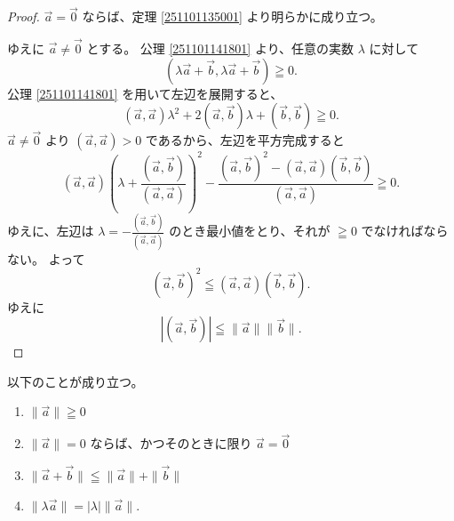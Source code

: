 \begin{proof}
  \(\vec{a}=\vec{0}\) ならば、定理 \ref{251101135001} より明らかに成り立つ。

  ゆえに \(\vec{a}\neq\vec{0}\) とする。
  公理 \ref{251101141801} より、任意の実数 \(\lambda\) に対して
  \[(\lambda\vec{a}+\vec{b},\lambda\vec{a}+\vec{b})\geqq0.\]
  公理 \ref{251101141801} を用いて左辺を展開すると、
  \[(\vec{a},\vec{a})\lambda^2+2(\vec{a},\vec{b})\lambda+(\vec{b},\vec{b})\geqq0.\]
  \(\vec{a}\neq\vec{0}\) より \((\vec{a},\vec{a})>0\) であるから、左辺を平方完成すると
  \[(\vec{a},\vec{a})\left(\lambda+\frac{(\vec{a},\vec{b})}{(\vec{a},\vec{a})}\right)^2-\frac{(\vec{a},\vec{b})^2-(\vec{a},\vec{a})(\vec{b},\vec{b})}{(\vec{a},\vec{a})}\geqq0.\]
  ゆえに、左辺は \(\displaystyle\lambda=-\frac{(\vec{a},\vec{b})}{(\vec{a},\vec{a})}\) のとき最小値をとり、それが \(\geqq0\) でなければならない。
  よって
  \[(\vec{a},\vec{b})^2\leqq(\vec{a},\vec{a})(\vec{b},\vec{b}).\]
  ゆえに
  \[|(\vec{a},\vec{b})|\leqq\|\vec{a}\|\|\vec{b}\|.\]
\end{proof}

\begin{thm}
  以下のことが成り立つ。
  \begin{enumerate}
    \item \(\|\vec{a}\|\geqq0\)
    \item \(\|\vec{a}\|=0\) ならば、かつそのときに限り \(\vec{a}=\vec{0}\)
    \item \(\|\vec{a}+\vec{b}\|\leqq\|\vec{a}\|+\|\vec{b}\|\)
    \item \(\|\lambda\vec{a}\|=|\lambda|\|\vec{a}\|.\)
  \end{enumerate}
\end{thm}

